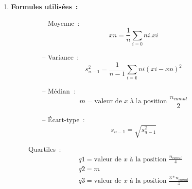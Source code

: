 \begin{enumerate}
    \item \textbf{Formules utilisées~:}
        \begin{figure}[!h]
            \centering
            \begin{minipage}{.49\linewidth}
                \begin{itemize}
                    \item[--] Moyenne~: 
                        \begin{equation}
                            xn = \frac{1}{n} \sum_{i=0} ni.xi
                        \end{equation}

                    \item[--] Variance~: 
                        \begin{equation}
                            s^2_{n-1} = \frac{1}{n-1} \sum_{i=0} ni(xi - xn)^2
                        \end{equation}
                \end{itemize}
            \end{minipage}\hfill\vline
            \begin{minipage}{.49\linewidth}
                \begin{itemize}
                    \item[--] Médian~:
                        \begin{equation}
                            m=\text{valeur de } x \text{ à la position } \frac{n_{cumul}}{2}
                        \end{equation}

                    \item[--] Écart-type~:
                        \begin{equation}
                            s_{n-1} = \sqrt{s^2_{n-1}}
                        \end{equation}
                \end{itemize}
            \end{minipage}
        \end{figure}

        \begin{itemize}
            \item[--] Quartiles~:
                \begin{gather}
                        q1 = \text{valeur de } x \text{ à la position } \frac{n_{cumul}}{4} \\
                        q2 = m \\
                        q3 = \text{valeur de } x \text{ à la position } \frac{3*n_{cumul}}{4} 
                \end{gather}   
        \end{itemize}


\end{enumerate}
